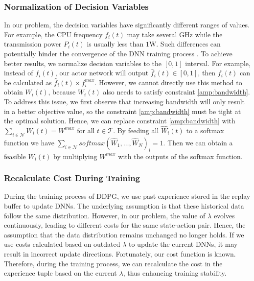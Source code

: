 \documentclass[lettersize, journal]{IEEEtran}
\begin{document}
\subsubsection{Normalization of Decision Variables}
In our problem, the decision variables have significantly different ranges of values.
For example, the CPU frequency $f_i(t)$ may take several GHz while the transmission power $P_i(t)$ is usually less than $1$W.
Such differences can potentially hinder the convergence of the DNN training process \cite{sola1997importance}.
To achieve better results, we normalize decision variables to the $[0,1]$ interval.
For example, instead of $f_i(t)$, our actor network will output $\hat{f}_i(t) \in [0,1]$, then
$f_i(t)$ can be calculated as $\hat{f}_i(t) \times f^{max}_i$.
However, we cannot directly use this method to obtain $W_i(t)$, because $W_i(t)$ also needs to satisfy constraint \eqref{amp:bandwidth}.
To address this issue, we first observe that increasing bandwidth will only result in a better objective value, 
so the constraint \eqref{amp:bandwidth} must be tight at the optimal solution.
Hence, we can replace constraint \eqref{amp:bandwidth} with $\sum_{i\in\mathcal{N}} W_i(t) = W^{max}$ for all $t\in\mathcal{T}$.
By feeding all $\hat{W}_i(t)$ to a softmax function we have $\sum_{i\in\mathcal{N}} softmax(\hat{W}_1, \dots, \hat{W}_N)_i = 1$.
Then we can obtain a feasible $W_i(t)$ by multiplying $W^{max}$ with the outputs of the softmax function.

\subsubsection{Recalculate Cost During Training}
During the training process of DDPG, we use past experience stored in the replay buffer to update DNNs.
The underlying assumption is that these historical data follow the same distribution. 
However, in our problem, the value of $\lambda$ evolves continuously, leading to different costs for the same state-action pair.
Hence, the assumption that the data distribution remains unchanged no longer holds.
If we use costs calculated based on outdated $\lambda$ to update the current DNNs, it may result in incorrect update directions.
Fortunately, our cost function is known.
Therefore, during the training process, we can recalculate the cost in the experience tuple based on the current $\lambda$,
thus enhancing training stability.
\end{document}
